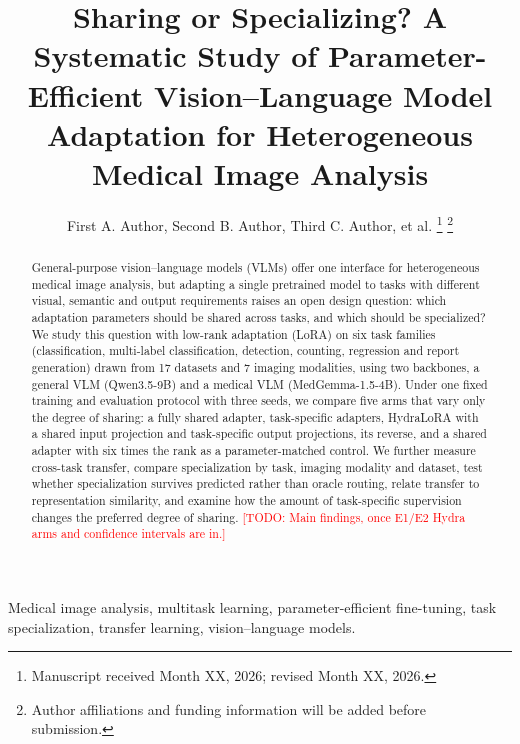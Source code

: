 \documentclass[journal,twoside,web]{ieeecolor}
\newcommand{\todo}[1]{\textcolor{red}{[TODO: #1]}}
\begin{document}
\title{Sharing or Specializing? A Systematic Study of
Parameter-Efficient Vision--Language Model Adaptation for
Heterogeneous Medical Image Analysis}

\author{
First A. Author,
Second B. Author,
Third C. Author,
et al.
\thanks{Manuscript received Month XX, 2026; revised Month XX, 2026.}
\thanks{Author affiliations and funding information will be added before
submission.}
}

\maketitle


\begin{abstract}

General-purpose vision--language models (VLMs) offer one interface for
heterogeneous medical image analysis, but adapting a single pretrained model
to tasks with different visual, semantic and output requirements raises an
open design question: which adaptation parameters should be shared across
tasks, and which should be specialized? We study this question with
low-rank adaptation (LoRA) on six task families (classification,
multi-label classification, detection, counting, regression and report
generation) drawn from 17 datasets and 7 imaging modalities, using two
backbones, a general VLM (Qwen3.5-9B) and a medical VLM (MedGemma-1.5-4B).
Under one fixed training and evaluation protocol with three seeds, we compare
five arms that vary only the degree of sharing: a fully shared adapter,
task-specific adapters, HydraLoRA with a shared input projection and
task-specific output projections, its reverse, and a shared adapter with six
times the rank as a parameter-matched control. We further measure cross-task
transfer, compare specialization by task, imaging modality and dataset, test
whether specialization survives predicted rather than oracle routing, relate
transfer to representation similarity, and examine how the amount of
task-specific supervision changes the preferred degree of sharing.
\todo{Main findings, once E1/E2 Hydra arms and confidence intervals are in.}

\end{abstract}

\begin{IEEEkeywords}
Medical image analysis, multitask learning, parameter-efficient fine-tuning,
task specialization, transfer learning, vision--language models.
\end{IEEEkeywords}
\end{document}
